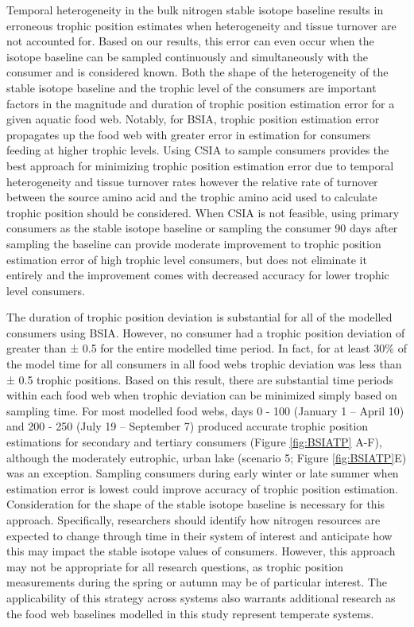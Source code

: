 \documentclass [11pt, proquest] {uwthesis}[2015/03/03]
\begin{document}
Temporal heterogeneity in the bulk nitrogen stable isotope baseline
results in erroneous trophic position estimates when heterogeneity and
tissue turnover are not accounted for. Based on our results, this error
can even occur when the isotope baseline can be sampled continuously and
simultaneously with the consumer and is considered known. Both the shape
of the heterogeneity of the stable isotope baseline and the trophic
level of the consumers are important factors in the magnitude and
duration of trophic position estimation error for a given aquatic food
web. Notably, for BSIA, trophic position estimation error propagates up
the food web with greater error in estimation for consumers feeding at
higher trophic levels. Using CSIA to sample consumers provides the best
approach for minimizing trophic position estimation error due to
temporal heterogeneity and tissue turnover rates however the relative
rate of turnover between the source amino acid and the trophic amino
acid used to calculate trophic position should be considered. When CSIA
is not feasible, using primary consumers as the stable isotope baseline
or sampling the consumer 90 days after sampling the baseline can provide
moderate improvement to trophic position estimation error of high
trophic level consumers, but does not eliminate it entirely and the
improvement comes with decreased accuracy for lower trophic level
consumers.

The duration of trophic position deviation is substantial for all of the
modelled consumers using BSIA. However, no consumer had a trophic
position deviation of greater than ± 0.5 for the entire modelled time
period. In fact, for at least 30\% of the model time for all consumers
in all food webs trophic deviation was less than ± 0.5 trophic
positions. Based on this result, there are substantial time periods
within each food web when trophic deviation can be minimized simply
based on sampling time. For most modelled food webs, days 0 - 100
(January 1 -- April 10) and 200 - 250 (July 19 -- September 7) produced
accurate trophic position estimations for secondary and tertiary
consumers (Figure \ref{fig:BSIATP} A-F), although the moderately
eutrophic, urban lake (scenario 5; Figure \ref{fig:BSIATP}E) was an
exception. Sampling consumers during early winter or late summer when
estimation error is lowest could improve accuracy of trophic position
estimation. Consideration for the shape of the stable isotope baseline
is necessary for this approach. Specifically, researchers should
identify how nitrogen resources are expected to change through time in
their system of interest and anticipate how this may impact the stable
isotope values of consumers. However, this approach may not be
appropriate for all research questions, as trophic position measurements
during the spring or autumn may be of particular interest. The
applicability of this strategy across systems also warrants additional
research as the food web baselines modelled in this study represent
temperate systems.
\end{document}
